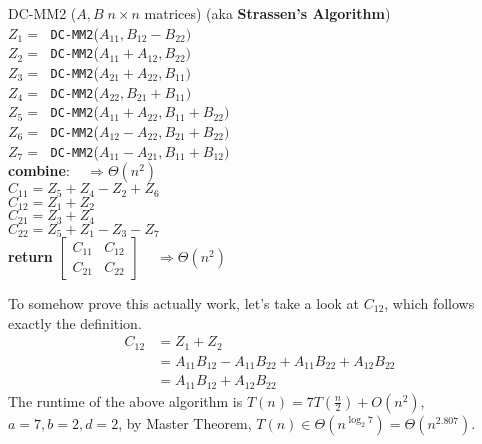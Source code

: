 \documentclass[twoside]{article}
\newcommand{\pc}[1]{\mbox{\textbf{#1}}} %
\begin{document}
\begin{algorithme}
	DC-MM2 ($A, B \; n \times n$ matrices) (aka \textbf{Strassen's Algorithm})\\
	\> $Z_{1} = \;$ \texttt{DC-MM2}($A_{11}, B_{12} - B_{22})$\\
	\> $Z_{2} = \;$ \texttt{DC-MM2}($A_{11}+A_{12}, B_{22})$\\
	\> $Z_{3} = \;$ \texttt{DC-MM2}($A_{21}+A_{22}, B_{11})$\\
	\> $Z_{4} = \;$ \texttt{DC-MM2}($A_{22}, B_{21} + B_{11})$\\
	\> $Z_{5} = \;$ \texttt{DC-MM2}($A_{11}+A_{22}, B_{11} + B_{22})$\\
	\> $Z_{6} = \;$ \texttt{DC-MM2}($A_{12}-A_{22}, B_{21} + B_{22})$\\
	\> $Z_{7} = \;$ \texttt{DC-MM2}($A_{11}-A_{21}, B_{11} + B_{12})$\\
	\>\pc{combine}: $\;\;\;\Rightarrow \Theta(n^2)$\\
	\>$C_{11} = Z_5 + Z_4 -Z_2 + Z_6$\\
	\>$C_{12} = Z_1 + Z_2$\\
	\>$C_{21} = Z_3 + Z_4$\\
	\>$C_{22} = Z_5 + Z_1 - Z_3 - Z_7$\\
	\> \pc{return} $\begin{bmatrix}
	C_{11} & C_{12} \\
	C_{21} & C_{22}
	\end{bmatrix}$ $\;\;\;\Rightarrow\Theta(n^2)$\\
\end{algorithme}
To somehow prove this actually work, let's take a look at $C_{12}$, which follows exactly the definition. \begin{align*}
C_{12} &= Z_1 + Z_2\\
&=A_{11}B_{12} - A_{11}B_{22} + A_{11}B_{22} + A_{12}B_{22}\\
&=A_{11}B_{12} + A_{12}B_{22}
\end{align*}
The runtime of the above algorithm is $T(n) = 7T(\frac{n}{2}) + O(n^2)$, $a = 7, b =2, d = 2$, by Master Theorem, $T(n) \in \Theta(n^{\log_2 7}) = \Theta(n^{2.807})$. 
\end{document}
